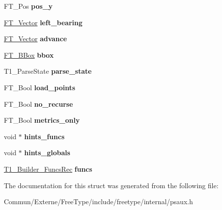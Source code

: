 \begin{DoxyCompactItemize}
\item 
F\+T\+\_\+\+Pos {\bfseries pos\+\_\+y}\hypertarget{struct_t1___builder_rec___ad389bf0d5182b677ed3dba05a9612530}{}\label{struct_t1___builder_rec___ad389bf0d5182b677ed3dba05a9612530}

\item 
\hyperlink{struct_f_t___vector__}{F\+T\+\_\+\+Vector} {\bfseries left\+\_\+bearing}\hypertarget{struct_t1___builder_rec___a86247b8fd87873ef93aecf0e27e4b6dc}{}\label{struct_t1___builder_rec___a86247b8fd87873ef93aecf0e27e4b6dc}

\item 
\hyperlink{struct_f_t___vector__}{F\+T\+\_\+\+Vector} {\bfseries advance}\hypertarget{struct_t1___builder_rec___a48575715ea96f16bdc7077996013ef9e}{}\label{struct_t1___builder_rec___a48575715ea96f16bdc7077996013ef9e}

\item 
\hyperlink{struct_f_t___b_box__}{F\+T\+\_\+\+B\+Box} {\bfseries bbox}\hypertarget{struct_t1___builder_rec___a534c6d954f8cf791a94489350314a8f7}{}\label{struct_t1___builder_rec___a534c6d954f8cf791a94489350314a8f7}

\item 
T1\+\_\+\+Parse\+State {\bfseries parse\+\_\+state}\hypertarget{struct_t1___builder_rec___afaa675cc3601ed05ed86bc474153094b}{}\label{struct_t1___builder_rec___afaa675cc3601ed05ed86bc474153094b}

\item 
F\+T\+\_\+\+Bool {\bfseries load\+\_\+points}\hypertarget{struct_t1___builder_rec___acaf59a770471bf90b5b7d9f72e97e64e}{}\label{struct_t1___builder_rec___acaf59a770471bf90b5b7d9f72e97e64e}

\item 
F\+T\+\_\+\+Bool {\bfseries no\+\_\+recurse}\hypertarget{struct_t1___builder_rec___a0369f22bec404666e1c7dc6bb648ac28}{}\label{struct_t1___builder_rec___a0369f22bec404666e1c7dc6bb648ac28}

\item 
F\+T\+\_\+\+Bool {\bfseries metrics\+\_\+only}\hypertarget{struct_t1___builder_rec___ab4c509b363e5a5f4da25460413e9364f}{}\label{struct_t1___builder_rec___ab4c509b363e5a5f4da25460413e9364f}

\item 
void $\ast$ {\bfseries hints\+\_\+funcs}\hypertarget{struct_t1___builder_rec___aeed4b5ebe5256cc07e31159b4a4a95ff}{}\label{struct_t1___builder_rec___aeed4b5ebe5256cc07e31159b4a4a95ff}

\item 
void $\ast$ {\bfseries hints\+\_\+globals}\hypertarget{struct_t1___builder_rec___ae94605dc79c1d54c1b59423046b38671}{}\label{struct_t1___builder_rec___ae94605dc79c1d54c1b59423046b38671}

\item 
\hyperlink{struct_t1___builder___funcs_rec__}{T1\+\_\+\+Builder\+\_\+\+Funcs\+Rec} {\bfseries funcs}\hypertarget{struct_t1___builder_rec___acecf3c6c134bccd36a1d30e10147ca54}{}\label{struct_t1___builder_rec___acecf3c6c134bccd36a1d30e10147ca54}

\end{DoxyCompactItemize}


The documentation for this struct was generated from the following file\+:\begin{DoxyCompactItemize}
\item 
Commun/\+Externe/\+Free\+Type/include/freetype/internal/psaux.\+h\end{DoxyCompactItemize}
